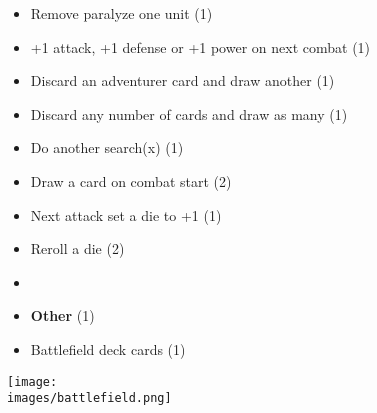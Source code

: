 \begin{multicols}{3}
\begin{itemize}[leftmargin=0pt, label={}, noitemsep]
  \item Remove paralyze one unit (1)
  \item +1 attack, +1 defense or +1 power on next combat (1)
  \item Discard an adventurer card and draw another (1)
  \item Discard any number of cards and draw as many (1)
  \item Do another search(x) (1)
  \item Draw a card on combat start (2)
  \item Next attack set a die to +1 (1)
  \item Reroll a die (2)
  \item
  \item \textbf{Other} (1)
  \item Battlefield deck cards (1)
\end{itemize}

\end{multicols}

\vfill
\begin{center}
  \texttt{[image: \\images/battlefield.png]}
\end{center}
